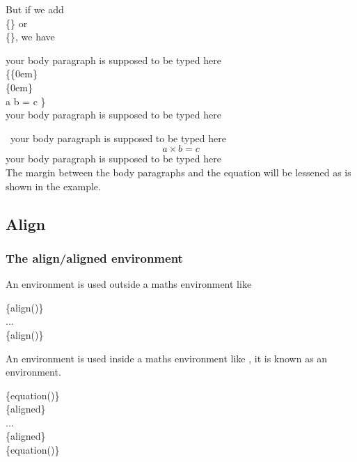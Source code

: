 \begin{frame}
	But if we add \\
	\{\} or\\
	\{\}, we have
    \begin{example}
		your body paragraph is supposed to be typed here\\
		\{\{0em\}\\
		\{0em\}\\
		a  b = c \}\\
		your body paragraph is supposed to be typed here\\
	\end{example}
	\ your body paragraph is supposed to be typed here
	{\setlength\abovedisplayskip{0em}
    \setlength\belowdisplayskip{0em}
    \begin{equation}a \times b =c \end{equation}}
    your body paragraph is supposed to be typed here\\[0.5em]
    The margin between the body paragraphs and the equation will be lessened as is shown in the example.
\end{frame}

\subsection{Align}

\begin{frame}
	\frametitle{The align/aligned environment}
	An  environment is used outside a maths environment like 
	\begin{command}
		\{align(\structure{*})\}\\
		\qquad ...\\
		\{align(\structure{*})\}\\
	\end{command}
	An  environment is used inside a maths environment like , it is known as an  environment.
	\begin{command}
		\{equation(\structure{*})\}\\
		\qquad{}\{aligned\}\\
		\qquad\qquad ...\\
		\qquad{}\{aligned\}\\
		\{equation(\structure{*})\}\\
	\end{command}
\end{frame}


